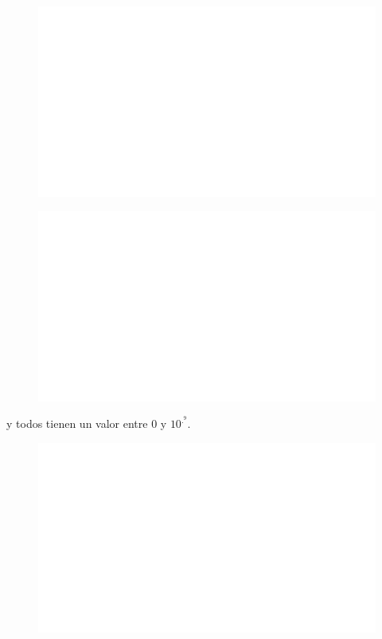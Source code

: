 \begin{centering}
    \begin{figure}[h]
        \centering
        \includegraphics[width=\textwidth]{whyareyoucheckingthenameofthisfile.png}
    \end{figure}
\end{centering}

\begin{centering}
    \begin{figure}
        \centering
        \includegraphics[width=\textwidth]{whyareyoucheckingthenameofthisfile.png}
    \end{figure}
\end{centering}
\noindent

y todos tienen un valor entre 0 y $10^{.^9}$.

\begin{centering}
    \begin{figure}[h]
        \centering
        \includegraphics[width=\textwidth]{whyareyoucheckingthenameofthisfile.png}
    \end{figure}
\end{centering}

